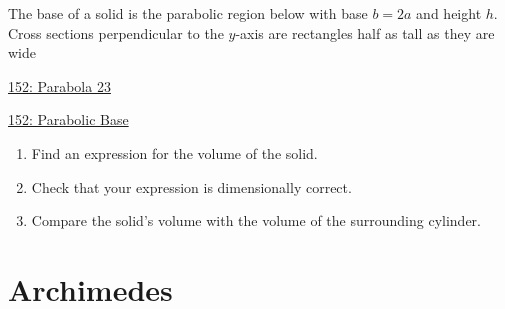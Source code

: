 \documentclass{ximera}
\begin{document}
\begin{question} \label{QLkdfmmdf}
The base of a solid is the parabolic region below with base $b=2a$ and height $h$. Cross sections perpendicular to the $y$-axis are rectangles half as tall as they are wide

\begin{onlineOnly}
    \begin{center}
\end{center}
\end{onlineOnly}

\href{ https://www.desmos.com/calculator/mbxrsmdho8}{152: Parabola 23}

\begin{onlineOnly}
    \begin{center}
\end{center}
\end{onlineOnly}

\href{https://www.desmos.com/3d/gdebhnchrz}{152: Parabolic Base}


\begin{enumerate}

\item Find an expression for the volume of the solid. 

\item Check that your expression is dimensionally correct.

\item Compare the solid's volume with the volume of the surrounding cylinder.


\end{enumerate}
\end{question}

\section{Archimedes}
\end{document}
